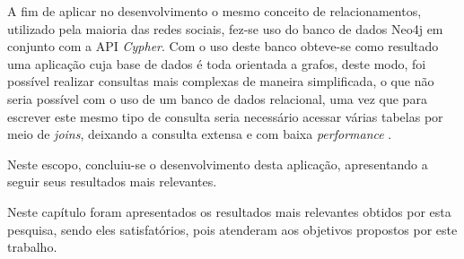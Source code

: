 \par A fim de aplicar no desenvolvimento o mesmo conceito de relacionamentos, utilizado pela maioria das redes sociais, fez-se uso do banco de dados Neo4j em conjunto com a API \textit{Cypher}. Com o uso deste banco obteve-se como resultado uma aplicação cuja base de dados é toda orientada a grafos, deste modo, foi possível realizar consultas mais complexas de maneira simplificada, o que não seria possível com o uso de um banco de dados relacional, uma vez que para escrever este mesmo tipo de consulta seria necessário acessar várias tabelas por meio de \textit{joins}, deixando a consulta extensa e com baixa \textit{performance} \cite{sadalage_fowler_nosql_distilled_brief_guide}.

\par Neste escopo, concluiu-se o desenvolvimento desta aplicação, apresentando a seguir seus resultados mais relevantes.







\par Neste capítulo foram apresentados os resultados mais relevantes obtidos por esta pesquisa, sendo eles satisfatórios, pois atenderam aos objetivos propostos por este trabalho.